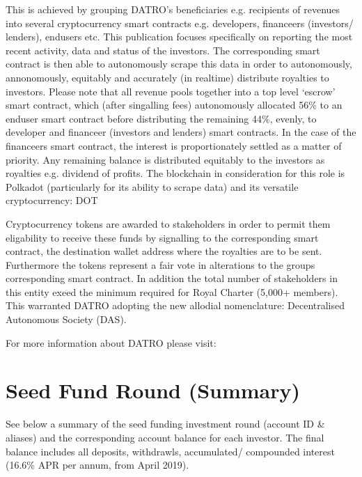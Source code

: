 \documentclass[letterpaper,10pt,openany,oneside,english]{sphinxmanual}
\begin{document}
\sphinxAtStartPar
This is achieved by grouping DATRO’s beneficiaries e.g. recipients of revenues \sphinxhyphen{} into several cryptocurrency smart contracts e.g. developers, financeers (investors/ lenders), end\sphinxhyphen{}users etc.
This publication focuses specifically on reporting the most recent activity, data and status of the investors. The corresponding smart contract is then able to autonomously scrape this data in order to autonomously, annonomously, equitably and accurately (in real\sphinxhyphen{}time) distribute royalties to investors.
Please note that all revenue pools together into a top level ‘escrow’ smart contract, which (after singalling fees) autonomously allocated 56\% to an end\sphinxhyphen{}user smart contract before distributing the remaining 44\%, evenly, to developer and financeer (investors and lenders) smart contracts.
In the case of the financeers smart contract, the interest is proportionately settled as a matter of priority. Any remaining balance is distributed equitably to the investors as royalties e.g. dividend of profits. The blockchain in consideration for this role is Polkadot (particularly for its ability to scrape data) and its versatile cryptocurrency: DOT

\sphinxAtStartPar
Cryptocurrency tokens are awarded to stakeholders in order to permit them eligability to receive these funds by signalling to the corresponding smart contract, the destination wallet address where the royalties are to be sent. Furthermore the tokens represent a fair vote in alterations to the groups corresponding smart contract.
In addition the total number of stakeholders in this entity exeed the minimum required for Royal Charter (5,000+ members). This warranted DATRO adopting the new allodial nomenclature: Decentralised Autonomous Society (DAS).

\sphinxAtStartPar
For more information about DATRO please visit: 


\chapter{Seed Fund Round (Summary)}
\label{\detokenize{summary-seed:seed-fund-round-summary}}\label{\detokenize{summary-seed::doc}}
\sphinxAtStartPar
See below a summary of the seed funding investment round (account ID \& aliases) and the corresponding account balance for each investor.
The final balance includes all deposits, withdrawls, accumulated/ compounded interest (16.6\% APR per annum, from April 2019).
\end{document}
